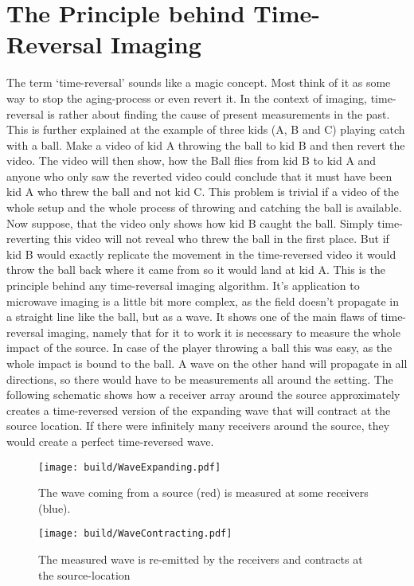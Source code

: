 \section{The Principle behind Time-Reversal Imaging}
The term `time-reversal' sounds like a magic concept.
Most think of it as some way to stop the aging-process or even revert it.
In the context of imaging, time-reversal is rather about finding the cause of present measurements in the past.
This is further explained at the example of three kids (A, B and C) playing catch with a ball.
Make a video of kid A throwing the ball to kid B and then revert the video.
The video will then show, how the Ball flies from kid B to kid A and anyone who only saw the reverted video could conclude that it must have been kid A who threw the ball and not kid C.
This problem is trivial if a video of the whole setup and the whole process of throwing and catching the ball is available.
Now suppose, that the video only shows how kid B caught the ball.
Simply time-reverting this video will not reveal who threw the ball in the first place.
But if kid B would exactly replicate the movement in the time-reversed video it would throw the ball back where it came from so it would land at kid A.
This is the principle behind any time-reversal imaging algorithm.
It's application to microwave imaging is a little bit more complex, as the field doesn't propagate in a straight line like the ball, but as a wave.
It shows one of the main flaws of time-reversal imaging, namely that for it to work it is necessary to measure the whole impact of the source.
In case of the player throwing a ball this was easy, as the whole impact is bound to the ball.
A wave on the other hand will propagate in all directions, so there would have to be measurements all around the setting.
The following schematic shows how a receiver array around the source approximately creates a time-reversed version of the expanding wave that will contract at the source location.
If there were infinitely many receivers around the source, they would create a perfect time-reversed wave.

\begin{figure}[ht]
    \centering
    \begin{minipage}{0.45\textwidth}
        \centering
        \texttt{[image: build/WaveExpanding.pdf]}
        \caption*{The wave coming from a source (red) is measured at some receivers (blue).}\label{fig:WaveTimeReversal}
    \end{minipage}\hfill
    \begin{minipage}{0.45\textwidth}
        \centering
        \texttt{[image: build/WaveContracting.pdf]}
        \caption*{The measured wave is re-emitted by the receivers and contracts at the source-location}\label{fig:WaveTimeReversalContraction}
    \end{minipage}
\end{figure}